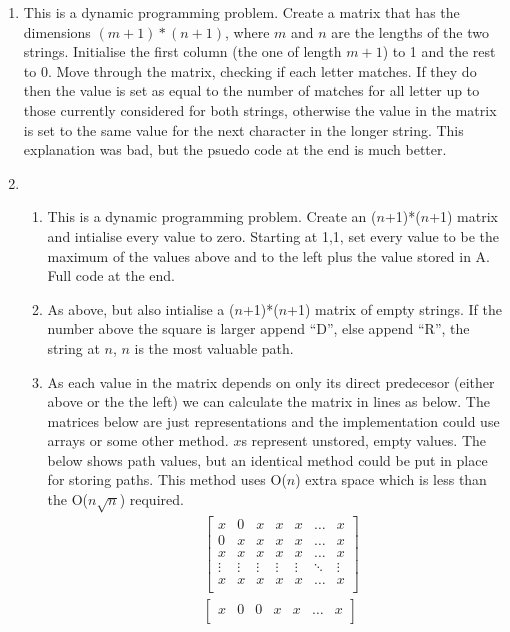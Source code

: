 \documentclass[a4paper]{article}
\begin{document}
\begin{enumerate}
		\item This is a dynamic programming problem. Create a matrix that has the dimensions $(m+1)*(n+1)$, where $m$ and $n$ are the lengths of the two strings. Initialise the first column (the one of length $m+1$) to 1 and the rest to 0. Move through the matrix, checking if each letter matches. If they do then the value is set as equal to the number of matches for all letter up to those currently considered for both strings, otherwise the value in the matrix is set to the same value for the next character in the longer string. This explanation was bad, but the psuedo code at the end is much better.
		\item 
				\begin{enumerate}
						\item This is a dynamic programming problem. Create an ($n$+1)*($n$+1) matrix and intialise every value to zero. Starting at 1,1, set every value to be the maximum of the values above and to the left plus the value stored in A. Full code at the end.
						\item As above, but also intialise a ($n$+1)*($n$+1) matrix of empty strings. If the number above the square is larger append ``D'', else append ``R'', the string at $n$, $n$ is the most valuable path.
						\item As each value in the matrix depends on only its direct predecesor (either above or the the left) we can calculate the matrix in lines as below. The matrices below are just representations and the implementation could use arrays or some other method. $x$s represent unstored, empty values. The below shows path values, but an identical method could be put in place for storing paths. This method uses O($n$) extra space which is less than the O($n\sqrt{n}$) required.
								\begin{align*}
										&
										\begin{bmatrix}
												x & 0 & x & x & x & \hdots & x \\
												0 & x & x & x & x & \hdots & x \\
												x & x & x & x & x & \hdots & x \\
												\vdots&\vdots&\vdots&\vdots&\vdots&\ddots&\vdots\\
												x & x & x & x & x & \hdots & x \\
										\end{bmatrix} \\
										&
										\begin{bmatrix}
												x & 0 & 0 & x & x & \hdots & x \\

\end{bmatrix}
\end{align*}
\end{enumerate}
\end{enumerate}
\end{document}
